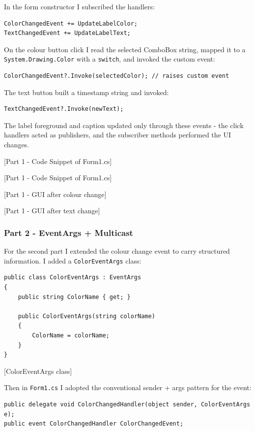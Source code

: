 In the form constructor I subscribed the handlers:
\begin{lstlisting}
ColorChangedEvent += UpdateLabelColor;
TextChangedEvent += UpdateLabelText;
\end{lstlisting}

On the colour button click I read the selected ComboBox string, mapped it to a \texttt{System.Drawing.Color} with a \texttt{switch}, and invoked the custom event:
\begin{lstlisting}
ColorChangedEvent?.Invoke(selectedColor); // raises custom event
\end{lstlisting}

The text button built a timestamp string and invoked:
\begin{lstlisting}
TextChangedEvent?.Invoke(newText);
\end{lstlisting}

The label foreground and caption updated only through these events - the click handlers acted as publishers, and the subscriber methods performed the UI changes.

[Part 1 - Code Snippet of Form1.cs]

[Part 1 - Code Snippet of Form1.cs]

[Part 1 - GUI after colour change]

[Part 1 - GUI after text change]

\subsubsection{Part 2 - EventArgs + Multicast}
For the second part I extended the colour change event to carry structured information. I added a \texttt{ColorEventArgs} class:
\begin{lstlisting}
public class ColorEventArgs : EventArgs
{
	public string ColorName { get; }

	public ColorEventArgs(string colorName)
	{
		ColorName = colorName;
	}
}
\end{lstlisting}

[ColorEventArgs class]

Then in \texttt{Form1.cs} I adopted the conventional sender + args pattern for the event:
\begin{lstlisting}
public delegate void ColorChangedHandler(object sender, ColorEventArgs e);
public event ColorChangedHandler ColorChangedEvent;
\end{lstlisting}

